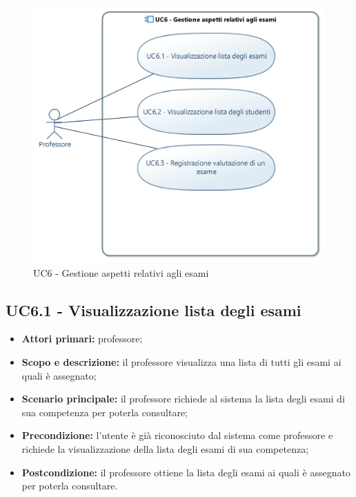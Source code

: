 \documentclass[AnalisiDeiRequisiti.tex]{subfiles}
\begin{document}
\begin{figure}[H]
	\centering
	\includegraphics[width=0.8\linewidth]{UC6.jpg}
	\caption{UC6 - Gestione aspetti relativi agli esami}
	\label{fig:UC6 - Gestione aspetti relativi agli esami}
\end{figure}

\subsection{UC6.1 - Visualizzazione lista degli esami}
\begin{itemize}
	\item \textbf{Attori primari:} professore;\\
	\item \textbf{Scopo e descrizione:} il professore visualizza una lista di tutti gli esami ai quali è assegnato;\\
	\item \textbf{Scenario principale:} il professore richiede al sistema la lista degli esami di sua competenza per poterla consultare;\\
	\item \textbf{Precondizione:} l'utente è già riconosciuto dal sistema come professore e richiede la visualizzazione della lista degli esami di sua competenza;\\
	\item \textbf{Postcondizione:} il professore ottiene la lista degli esami ai quali è assegnato per poterla consultare.\\
\end{itemize}
\end{document}

